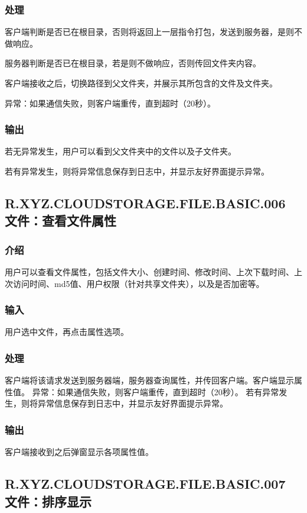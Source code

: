 \subsubsection{处理}
客户端判断是否已在根目录，否则将返回上一层指令打包，发送到服务器，是则不做响应。

服务器判断是否已在根目录，若是则不做响应，否则传回文件夹内容。

客户端接收之后，切换路径到父文件夹，并展示其所包含的文件及文件夹。

异常：如果通信失败，则客户端重传，直到超时（20秒）。

\subsubsection{输出}
若无异常发生，用户可以看到父文件夹中的文件以及子文件夹。

若有异常发生，则将异常信息保存到日志中，并显示友好界面提示异常。

\subsection{R.XYZ.CLOUDSTORAGE.FILE.BASIC.006 文件：查看文件属性}

\subsubsection{介绍} 
用户可以查看文件属性，包括文件大小、创建时间、修改时间、上次下载时间、上次访问时间、md5值、用户权限（针对共享文件夹），以及是否加密等。

\subsubsection{输入} 
用户选中文件，再点击属性选项。

\subsubsection{处理}
客户端将该请求发送到服务器端，服务器查询属性，并传回客户端。客户端显示属性值。
异常：如果通信失败，则客户端重传，直到超时（20秒）。
若有异常发生，则将异常信息保存到日志中，并显示友好界面提示异常。

\subsubsection{输出}
客户端接收到之后弹窗显示各项属性值。


\subsection{R.XYZ.CLOUDSTORAGE.FILE.BASIC.007 文件：排序显示}


